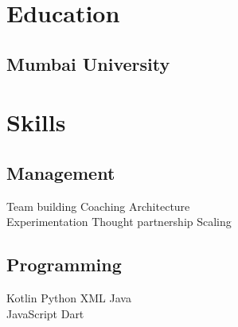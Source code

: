 \documentclass[]{deedy-resume-reversed}
\begin{document}
\begin{minipage}[t]{0.60\textwidth}

% 
% 

%
%

\end{minipage}
\hfill
\begin{minipage}[t]{0.33\textwidth}


\section{Education}

\subsection{Mumbai University}
\sectionsep


\section{Skills}

\subsection{Management}
Team building \textbullet{} Coaching \textbullet{} Architecture \\\textbullet{}
Experimentation \textbullet{} Thought partnership \textbullet{} Scaling
\sectionsep

\subsection{Programming}
Kotlin \textbullet{} Python \textbullet{} XML \textbullet{}
Java \\\textbullet{} JavaScript \textbullet{} Dart
\sectionsep


\end{minipage}
\end{document}
